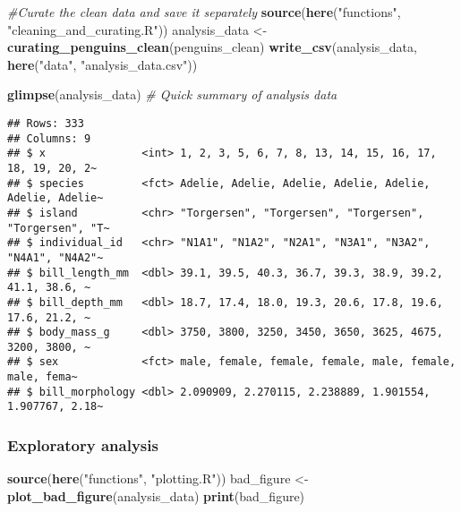 \documentclass[
]{article}
\newenvironment{Shaded}{\begin{snugshade}}{\end{snugshade}}
\newcommand{\CommentTok}[1]{\textcolor[rgb]{0.56,0.35,0.01}{\textit{#1}}}
\newcommand{\FunctionTok}[1]{\textcolor[rgb]{0.13,0.29,0.53}{\textbf{#1}}}
\newcommand{\NormalTok}[1]{#1}
\newcommand{\OtherTok}[1]{\textcolor[rgb]{0.56,0.35,0.01}{#1}}
\newcommand{\StringTok}[1]{\textcolor[rgb]{0.31,0.60,0.02}{#1}}
\begin{document}
\begin{Shaded}
\begin{Highlighting}[]
\CommentTok{\#Curate the clean data and save it separately}
\FunctionTok{source}\NormalTok{(}\FunctionTok{here}\NormalTok{(}\StringTok{"functions"}\NormalTok{, }\StringTok{"cleaning\_and\_curating.R"}\NormalTok{))}
\NormalTok{analysis\_data }\OtherTok{\textless{}{-}} \FunctionTok{curating\_penguins\_clean}\NormalTok{(penguins\_clean)}
\FunctionTok{write\_csv}\NormalTok{(analysis\_data, }\FunctionTok{here}\NormalTok{(}\StringTok{"data"}\NormalTok{, }\StringTok{"analysis\_data.csv"}\NormalTok{))}

\FunctionTok{glimpse}\NormalTok{(analysis\_data) }\CommentTok{\# Quick summary of analysis data}
\end{Highlighting}
\end{Shaded}

\begin{verbatim}
## Rows: 333
## Columns: 9
## $ x               <int> 1, 2, 3, 5, 6, 7, 8, 13, 14, 15, 16, 17, 18, 19, 20, 2~
## $ species         <fct> Adelie, Adelie, Adelie, Adelie, Adelie, Adelie, Adelie~
## $ island          <chr> "Torgersen", "Torgersen", "Torgersen", "Torgersen", "T~
## $ individual_id   <chr> "N1A1", "N1A2", "N2A1", "N3A1", "N3A2", "N4A1", "N4A2"~
## $ bill_length_mm  <dbl> 39.1, 39.5, 40.3, 36.7, 39.3, 38.9, 39.2, 41.1, 38.6, ~
## $ bill_depth_mm   <dbl> 18.7, 17.4, 18.0, 19.3, 20.6, 17.8, 19.6, 17.6, 21.2, ~
## $ body_mass_g     <dbl> 3750, 3800, 3250, 3450, 3650, 3625, 4675, 3200, 3800, ~
## $ sex             <fct> male, female, female, female, male, female, male, fema~
## $ bill_morphology <dbl> 2.090909, 2.270115, 2.238889, 1.901554, 1.907767, 2.18~
\end{verbatim}

\subsubsection{Exploratory analysis}\label{exploratory-analysis}

\begin{Shaded}
\begin{Highlighting}[]
\FunctionTok{source}\NormalTok{(}\FunctionTok{here}\NormalTok{(}\StringTok{"functions"}\NormalTok{, }\StringTok{"plotting.R"}\NormalTok{))}
\NormalTok{bad\_figure }\OtherTok{\textless{}{-}} \FunctionTok{plot\_bad\_figure}\NormalTok{(analysis\_data)}
\FunctionTok{print}\NormalTok{(bad\_figure)}
\end{Highlighting}
\end{Shaded}
\end{document}
